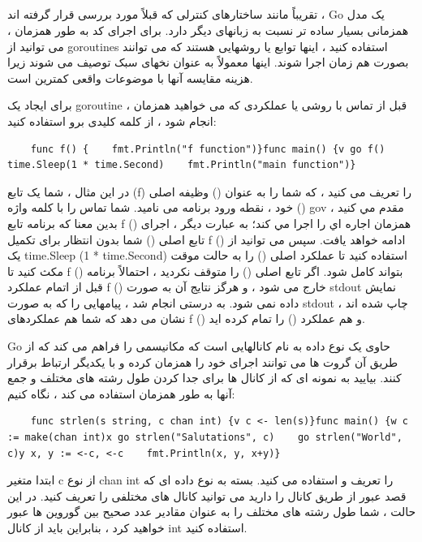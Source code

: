 \documentclass[12pt]{book}
\begin{document}
\subsection{}
تقریباً مانند ساختارهای کنترلی که قبلاً مورد بررسی قرار گرفته اند ، Go یک مدل همزمانی بسیار ساده تر نسبت به زبانهای دیگر دارد. برای اجرای کد به طور همزمان ، می توانید از goroutines استفاده کنید ، اینها توابع یا روشهایی هستند که می توانند بصورت هم زمان اجرا شوند. اینها معمولاً به عنوان نخهای سبک توصیف می شوند زیرا هزینه مقایسه آنها با موضوعات واقعی کمترین است.

برای ایجاد یک goroutine ، قبل از تماس با روشی یا عملکردی که می خواهید همزمان انجام شود ، از کلمه کلیدی برو استفاده کنید:
\begin{latin}
	\begin{lstlisting}
	func f() {    fmt.Println("f function")}func main() {v go f()    time.Sleep(1 * time.Second)    fmt.Println("main function")}
	\end{lstlisting}
\end{latin}

در این مثال ، شما یک تابع (f) را تعریف می کنید ، که شما را به عنوان () وظیفه اصلی () خود ، نقطه ورود برنامه می نامید. شما تماس را با كلمه واژه gov مقدم مي كنيد ، بدين معنا كه برنامه تابع f () همزمان اجاره اي را اجرا مي كند؛ به عبارت دیگر ، اجرای تابع اصلی () شما بدون انتظار برای تکمیل f () ادامه خواهد یافت. سپس می توانید از یک time.Sleep (1 * time.Second) استفاده کنید تا عملکرد اصلی () را به حالت موقت مکث کنید تا f () بتواند کامل شود. اگر تابع اصلی () را متوقف نکردید ، احتمالاً برنامه قبل از اتمام عملکرد f () خارج می شود ، و هرگز نتایج آن به صورت stdout نمایش داده نمی شود. به درستی انجام شد ، پیامهایی را که به صورت stdout چاپ شده اند ، نشان می دهد که شما هم عملکردهای f () و هم عملکرد () را تمام کرده اید.

Go حاوی یک نوع داده به نام کانالهایی است که مکانیسمی را فراهم می کند که از طریق آن گروت ها می توانند اجرای خود را همزمان کرده و با یکدیگر ارتباط برقرار کنند. بیایید به نمونه ای که از کانال ها برای جدا کردن طول رشته های مختلف و جمع آنها به طور همزمان استفاده می کند ، نگاه کنیم:
\begin{latin}
	\begin{lstlisting}
	func strlen(s string, c chan int) {v c <- len(s)}func main() {w c := make(chan int)x go strlen("Salutations", c)    go strlen("World", c)y x, y := <-c, <-c    fmt.Println(x, y, x+y)}
	\end{lstlisting}
\end{latin}

ابتدا متغیر c از نوع chan int را تعریف و استفاده می کنید. بسته به نوع داده ای که قصد عبور از طریق کانال را دارید می توانید کانال های مختلفی را تعریف کنید. در این حالت ، شما طول رشته های مختلف را به عنوان مقادیر عدد صحیح بین گوروین ها عبور خواهید کرد ، بنابراین باید از کانال int استفاده کنید.
\end{document}

